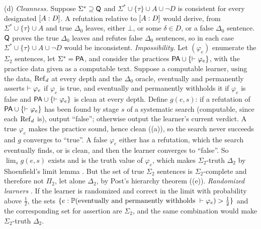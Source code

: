 (d) \emph{Cleanness.} Suppose $\Sigma^*\supseteq\mathsf{Q}$ and $\Sigma^*\cup\{\tau\}\cup A\cup\neg D$ is consistent for every designated $[A : D]$. A refutation relative to $[A : D]$ would derive, from $\Sigma^*\cup\{\tau\}\cup A$ and true $\Delta_0$ leaves, either $\bot$, or some $\delta\in D$, or a false $\Delta_0$ sentence. $\mathsf{Q}$ proves the true $\Delta_0$ leaves and refutes false $\Delta_0$ sentences, so in each case $\Sigma^*\cup\{\tau\}\cup A\cup\neg D$ would be inconsistent. \emph{Impossibility.} Let $(\varphi_e)$ enumerate the $\Sigma_2$ sentences, let $\Sigma^*=\mathsf{PA}$, and consider the practices $\mathsf{PA}\cup\{\vdash\varphi_e\}$, with the practice data given as a computable text. Suppose a computable learner, using the data, $\mathrm{Ref}_d$ at every depth and the $\Delta_0$ oracle, eventually and permanently asserts $\vdash\varphi_e$ if $\varphi_e$ is true, and eventually and permanently withholds it if $\varphi_e$ is false and $\mathsf{PA}\cup\{\vdash\varphi_e\}$ is clean at every depth. Define $g(e,s)$: if a refutation of $\mathsf{PA}\cup\{\vdash\varphi_e\}$ has been found by stage $s$ of a systematic search (computable, since each $\mathrm{Ref}_d$ is), output ``false''; otherwise output the learner's current verdict. A true $\varphi_e$ makes the practice sound, hence clean ((a)), so the search never succeeds and $g$ converges to ``true''. A false $\varphi_e$ either has a refutation, which the search eventually finds, or is clean, and then the learner converges to ``false''. So $\lim_sg(e,s)$ exists and is the truth value of $\varphi_e$, which makes $\Sigma_2$-truth $\Delta_2$ by Shoenfield's limit lemma \citep{shoenfield1959degrees}. But the set of true $\Sigma_2$ sentences is $\Sigma_2$-complete and therefore not $\Pi_2$, let alone $\Delta_2$, by Post's hierarchy theorem ((e)). \emph{Randomized learners} . If the learner is randomized and correct in the limit with probability above $\frac12$, the sets $\{e:\mathbb{P}(\text{eventually and permanently withholds }\vdash\varphi_e)>\frac12\}$ and the corresponding set for assertion are $\Sigma_2$, and the same combination would make $\Sigma_2$-truth $\Delta_2$.


